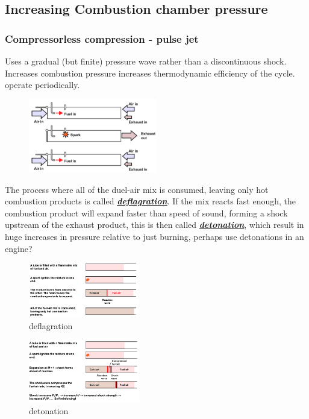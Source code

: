 \documentclass[a4paper,10pt]{article}
\begin{document}
\subsection{Increasing Combustion chamber pressure}

\subsubsection{Compressorless compression - pulse jet}
Uses a gradual (but finite) pressure wave rather than a discontinuous shock. Increases combustion pressure increases thermodynamic efficiency of the cycle. operate periodically. 
\begin{figure}[H]
    \centering
    \includegraphics[width=0.5\textwidth]{Figure/pulse.png}
\end{figure}

\vspace*{-0.5cm}
The process where all of the duel-air mix is consumed, leaving only hot combustion products is called \underline{\textbf{\textit{deflagration}}}. If the mix reacts fast enough, the combustion product will expand faster than speed of sound, forming a shock upstream of the exhaust product, this is then called \underline{\textit{\textbf{detonation}}}, which  result in huge increases in pressure relative to just burning, perhaps use detonations in an engine?
\vspace*{0.5cm}
\begin{multicols}{2}
    \begin{figure}[H]
        \centering
        \includegraphics[width=0.43\textwidth]{Figure/deflagration.png}
        \caption[short]{deflagration}
    \end{figure}

    \begin{figure}[H]
        \centering
        \includegraphics[width=0.43\textwidth]{Figure/detonation.png}
        \caption[short]{detonation}
    \end{figure}
\end{multicols}
\end{document}
